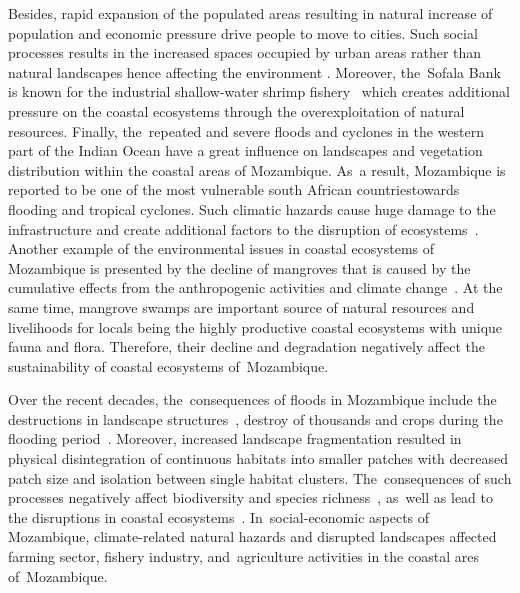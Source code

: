 \documentclass[coasts,article,accept,pdftex,oneauthor]{Definitions/mdpi}
\begin{document}
Besides, rapid expansion of the populated areas resulting {in} natural increase {of} population and economic pressure {drive} people to move to cities{. Such social processes }results in the increased spaces occupied by urban areas rather than natural landscapes {hence affecting the environment }\cite{JOKARARSANJANI201838}. Moreover, the~Sofala Bank is known for the industrial shallow-water shrimp fishery~\cite{SOUSA2006207,MIGUEL2003365,GAMMELSROD199291} which creates additional pressure on the coastal ecosystems through the overexploitation of natural resources. Finally, the~repeated and severe floods and cyclones in the western part of the Indian Ocean have a great influence on{ }landscapes and vegetation distribution {within the} coastal {areas of }Mozambique. As~a result, Mozambique is reported to be one of the most vulnerable south African countries{towards} flooding and tropical cyclones{. Such climatic hazards }cause huge damage to {the }infrastructure and {create additional factors to the disruption of }ecosystems~\cite{NHANGUMBE2023101015,SALVUCCI2020106713,Gall}. {Another example of the }environmental {issues in} coastal {ecosystems} of Mozambique {is presented by }the decline of mangroves {that is caused by the cumulative effects from }the anthropogenic activities and climate change~\cite{COME2023106813}. {At the same time, }mangrove swamps are important source of natural resources and livelihoods for locals {being the} highly productive coastal ecosystems with unique fauna and flora. Therefore, their decline and degradation negatively affect the sustainability of coastal ecosystems of~Mozambique.

{Over the recent decades, the~}consequences of floods in Mozambique include the destructions in landscape structures~\cite{FICHTNER2023103329}, destroy of thousands {and} crops during the flooding {period}~\cite{BOFANA2022112808}. {Moreover, increased }landscape fragmentation {resulted in physical disintegration of continuous habitats into smaller patches with decreased }patch size and isolation {between single habitat clusters. The~consequences of such processes negatively affect }biodiversity and species richness~\cite{Guldemond}, as~well as lead to the disruptions in coastal ecosystems~\cite{RAMAYANTI20221025}. In~social-economic aspects of Mozambique, climate-related natural hazards and disrupted landscapes affected farming sector, fishery industry, and~agriculture activities in the coastal ares of~Mozambique. 
\end{document}
